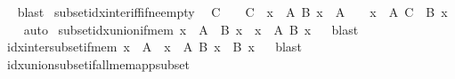 \begin{isabellebody}
\isadelimproof
\ %
\endisadelimproof
%
\isatagproof
{}\isamarkupfalse%
\ blast%
\endisatagproof
{\isafoldproof}%
%
\isadelimproof
%
\endisadelimproof
\isanewline
\isanewline
{}\isamarkupfalse%
\ subset{\isacharunderscore}{\kern0pt}idx{\isacharunderscore}{\kern0pt}inter{\isacharunderscore}{\kern0pt}iff{\isacharunderscore}{\kern0pt}if{\isacharunderscore}{\kern0pt}ne{\isacharunderscore}{\kern0pt}empty{\isacharcolon}{\kern0pt}\isanewline
\ \ {\isachardoublequoteopen}C\ {\isasymnoteq}\ {\isacharbraceleft}{\kern0pt}{\isacharbraceright}{\kern0pt}\ {\isasymLongrightarrow}\ C\ {\isasymsubseteq}\ {\isacharparenleft}{\kern0pt}{\isasymInter}x\ {\isasymin}\ A{\isachardot}{\kern0pt}\ B\ x{\isacharparenright}{\kern0pt}\ {\isasymlongleftrightarrow}\ {\isacharparenleft}{\kern0pt}A\ {\isasymnoteq}\ {\isacharbraceleft}{\kern0pt}{\isacharbraceright}{\kern0pt}\ {\isasymand}\ {\isacharparenleft}{\kern0pt}{\isasymforall}x\ {\isasymin}\ A{\isachardot}{\kern0pt}\ C\ {\isasymsubseteq}\ B\ x{\isacharparenright}{\kern0pt}{\isacharparenright}{\kern0pt}{\isachardoublequoteclose}\isanewline
%
\isadelimproof
\ \ %
\endisadelimproof
%
\isatagproof
{}\isamarkupfalse%
\ auto%
\endisatagproof
{\isafoldproof}%
%
\isadelimproof
\isanewline
%
\endisadelimproof
\isanewline
{}\isamarkupfalse%
\ subset{\isacharunderscore}{\kern0pt}idx{\isacharunderscore}{\kern0pt}union{\isacharunderscore}{\kern0pt}if{\isacharunderscore}{\kern0pt}mem{\isacharcolon}{\kern0pt}\ {\isachardoublequoteopen}x\ {\isasymin}\ A\ {\isasymLongrightarrow}\ B\ x\ {\isasymsubseteq}\ {\isacharparenleft}{\kern0pt}{\isasymUnion}x\ {\isasymin}\ A{\isachardot}{\kern0pt}\ B\ x{\isacharparenright}{\kern0pt}{\isachardoublequoteclose}%
\isadelimproof
\ %
\endisadelimproof
%
\isatagproof
{}\isamarkupfalse%
\ blast%
\endisatagproof
{\isafoldproof}%
%
\isadelimproof
%
\endisadelimproof
\isanewline
\isanewline
{}\isamarkupfalse%
\ idx{\isacharunderscore}{\kern0pt}inter{\isacharunderscore}{\kern0pt}subset{\isacharunderscore}{\kern0pt}if{\isacharunderscore}{\kern0pt}mem{\isacharcolon}{\kern0pt}\ {\isachardoublequoteopen}x\ {\isasymin}\ A\ {\isasymLongrightarrow}\ {\isacharparenleft}{\kern0pt}{\isasymInter}x\ {\isasymin}\ A{\isachardot}{\kern0pt}\ B\ x{\isacharparenright}{\kern0pt}\ {\isasymsubseteq}\ B\ x{\isachardoublequoteclose}%
\isadelimproof
\ %
\endisadelimproof
%
\isatagproof
{}\isamarkupfalse%
\ blast%
\endisatagproof
{\isafoldproof}%
%
\isadelimproof
%
\endisadelimproof
\isanewline
\isanewline
{}\isamarkupfalse%
\ idx{\isacharunderscore}{\kern0pt}union{\isacharunderscore}{\kern0pt}subset{\isacharunderscore}{\kern0pt}if{\isacharunderscore}{\kern0pt}all{\isacharunderscore}{\kern0pt}mem{\isacharunderscore}{\kern0pt}app{\isacharunderscore}{\kern0pt}subset{\isacharcolon}{\kern0pt}\isanewline

\end{isabellebody}
